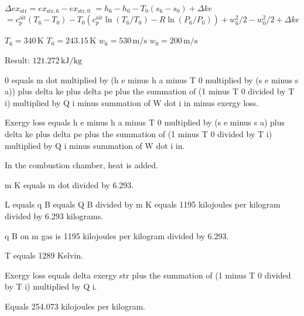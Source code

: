 \( \Delta ex_{\text{str}} = ex_{\text{str},6} - ex_{\text{str},0} \)  
\( = h_6 - h_0 - T_0 (s_6 - s_0) + \Delta ke \)  
\( = c_p^{\text{air}} (T_6 - T_0) - T_0 (c_p^{\text{air}} \ln(T_6 / T_0) - R \ln(P_6 / P_0)) + w_6^2 / 2 - w_0^2 / 2 + \Delta ke \)  

\( T_6 = 340 \, \text{K} \)  
\( T_0 = 243.15 \, \text{K} \)  
\( w_6 = 530 \, \text{m/s} \)  
\( w_0 = 200 \, \text{m/s} \)  

Result: \( 121.272 \, \text{kJ/kg} \)

0 equals m dot multiplied by (h e minus h a minus T 0 multiplied by (s e minus s a)) plus delta ke plus delta pe plus the summation of (1 minus T 0 divided by T i) multiplied by Q i minus summation of W dot i in minus exergy loss.  

Exergy loss equals h e minus h a minus T 0 multiplied by (s e minus s a) plus delta ke plus delta pe plus the summation of (1 minus T 0 divided by T i) multiplied by Q i minus summation of W dot i in.  

In the combustion chamber, heat is added.  

m K equals m dot divided by 6.293.  

L equals q B equals Q B divided by m K equals 1195 kilojoules per kilogram divided by 6.293 kilograms.  

q B on m gas is 1195 kilojoules per kilogram divided by 6.293.  

T equals 1289 Kelvin.  

Exergy loss equals delta exergy str plus the summation of (1 minus T 0 divided by T i) multiplied by Q i.  

Equals 254.073 kilojoules per kilogram.